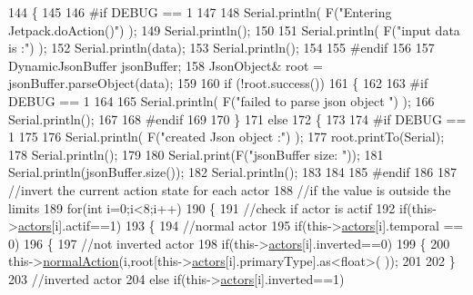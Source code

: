 \begin{DoxyCode}
144 \{
145 
146 \textcolor{preprocessor}{#if DEBUG == 1 }
147 
148     Serial.println( F(\textcolor{stringliteral}{"Entering Jetpack.doAction()"}) );
149     Serial.println();
150 
151     Serial.println( F(\textcolor{stringliteral}{"input data is :"}) );
152     Serial.println(data);
153     Serial.println();
154 
155 \textcolor{preprocessor}{#endif }
156 
157     DynamicJsonBuffer jsonBuffer;
158     JsonObject& root = jsonBuffer.parseObject(data);
159     
160     \textcolor{keywordflow}{if} (!root.success()) 
161     \{
162     
163 \textcolor{preprocessor}{    #if DEBUG == 1 }
164 
165         Serial.println( F(\textcolor{stringliteral}{"failed to parse json object "}) );
166         Serial.println();
167     
168 \textcolor{preprocessor}{    #endif }
169 
170     \}
171     \textcolor{keywordflow}{else}
172     \{
173     
174 \textcolor{preprocessor}{    #if DEBUG == 1 }
175 
176         Serial.println( F(\textcolor{stringliteral}{"created Json object :"}) );
177         root.printTo(Serial);
178         Serial.println();
179 
180         Serial.print(F(\textcolor{stringliteral}{"jsonBuffer size: "}));
181         Serial.println(jsonBuffer.size());
182         Serial.println();
183 
184     
185 \textcolor{preprocessor}{    #endif }
186 
187         \textcolor{comment}{//invert the current action state for each actor}
188         \textcolor{comment}{//if the value is outside the limits}
189         \textcolor{keywordflow}{for}(\textcolor{keywordtype}{int} i=0;i<8;i++)
190         \{
191             \textcolor{comment}{//check if actor is actif}
192             \textcolor{keywordflow}{if}(this->\hyperlink{class_jetpack_a7e16d2f97837f9712a2e6de1c50d99db}{actors}[i].actif==1)
193             \{
194                 \textcolor{comment}{//normal actor}
195                 \textcolor{keywordflow}{if}(this->\hyperlink{class_jetpack_a7e16d2f97837f9712a2e6de1c50d99db}{actors}[i].temporal == 0)
196                 \{
197                     \textcolor{comment}{//not inverted actor}
198                     \textcolor{keywordflow}{if}(this->\hyperlink{class_jetpack_a7e16d2f97837f9712a2e6de1c50d99db}{actors}[i].inverted==0)
199                     \{
200                         this->\hyperlink{class_jetpack_a65ce9533c39fa71e4945b970bf14b980}{normalAction}(i,root[this->\hyperlink{class_jetpack_a7e16d2f97837f9712a2e6de1c50d99db}{actors}[i].primaryType].as<float>(
      ));
201             
202                     \}
203                     \textcolor{comment}{//inverted actor}
204                     \textcolor{keywordflow}{else} \textcolor{keywordflow}{if}(this->\hyperlink{class_jetpack_a7e16d2f97837f9712a2e6de1c50d99db}{actors}[i].inverted==1)

\end{DoxyCode}
